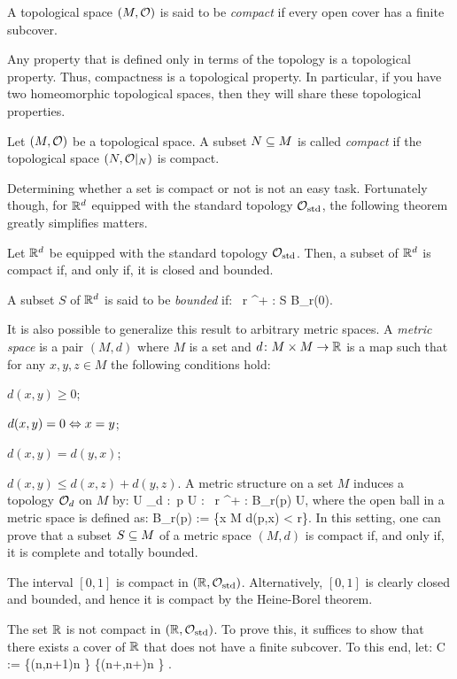 \bd
A topological space $(M,\mathcal{O})$ is said to be \emph{compact} if every open cover has a finite subcover.
\ed

Any property that is defined only in terms of the topology is a topological
property. Thus, compactness is a topological property. In particular, if you
have two homeomorphic topological spaces, then they will share these
topological properties.

\bd
Let $(M,\mathcal{O})$ be a topological space. A subset $N\subseteq M$ is called \emph{compact} if the topological space $(N,\mathcal{O}|_N)$ is compact.
\ed

Determining whether a set is compact or not is not an easy task. Fortunately though, for $\mathbb{R}^d$ equipped with the standard topology $\mathcal{O}_\mathrm{std}$, the following theorem greatly simplifies matters.

Let $\mathbb{R}^d$ be equipped with the standard topology $\mathcal{O}_\mathrm{std}$. Then, a subset of $\mathbb{R}^d$ is compact if, and only if, it is closed and bounded.
\et

A subset $S$ of $\mathbb{R}^d$ is said to be \emph{bounded} if:
\bse
\exists \, r \in \R^+ : S \se B_r(0). 
\ese

\br
It is also possible to generalize this result to arbitrary metric spaces. A \emph{metric space} is a pair $(M,d)$ where $M$ is a set and $d\colon M\times M \to \mathbb{R}$ is a map such that for any $x,y,z \in M$ the following conditions hold:
\ben
\item[i)] $d(x,y) \geq 0$;
\item[ii)] $d(x,y) = 0 \Leftrightarrow x = y$;
\item[iii)] $d(x,y) = d(y,x) $;
\item[iv)] $d(x,y)\leq d(x,z)+d(y,z)$.
\een
A metric structure on a set $M$ induces a topology $\mathcal{O}_d$ on $M$ by:
\bse
U \in \cO_d :\eqv \forall \, p \in U : \exists \, r \in \R^+ : B_r(p) \se U,
\ese
where the open ball in a metric space is defined as:
\bse
B_r(p) := \{x \in M \mid d(p,x) < r\}.
\ese
In this setting, one can prove that a subset $S\subseteq M$ of a metric space $(M,d)$ is compact if, and only if, it is complete and totally bounded.
\er

\be
The interval $[0,1]$ is compact in $(\mathbb{R},\mathcal{O}_\mathrm{std})$. Alternatively, $[0,1]$ is clearly closed and bounded, and hence it is compact by the Heine-Borel theorem.
\ee

\be
The set $\mathbb{R}$ is not compact in $(\mathbb{R},\mathcal{O}_\mathrm{std})$. To prove this, it suffices to show that there exists a cover of $\mathbb{R}$ that does not have a finite subcover. To this end, let:
\bse
C := \{(n,n+1)\mid n \in \Z\} \cup \{(n+,n+)\mid n \in \Z\} .
\ese

